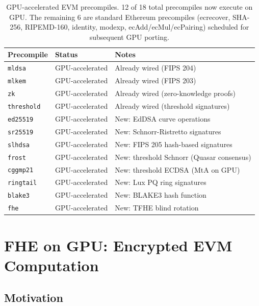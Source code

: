 \documentclass[11pt]{article}
\begin{document}
\begin{table}[h]
\centering
\small
\begin{tabular}{lll}
\toprule
\textbf{Precompile} & \textbf{Status} & \textbf{Notes} \\
\midrule
\texttt{mldsa}     & GPU-accelerated & Already wired (FIPS 204) \\
\texttt{mlkem}     & GPU-accelerated & Already wired (FIPS 203) \\
\texttt{zk}        & GPU-accelerated & Already wired (zero-knowledge proofs) \\
\texttt{threshold} & GPU-accelerated & Already wired (threshold signatures) \\
\texttt{ed25519}   & GPU-accelerated & New: EdDSA curve operations \\
\texttt{sr25519}   & GPU-accelerated & New: Schnorr-Ristretto signatures \\
\texttt{slhdsa}    & GPU-accelerated & New: FIPS 205 hash-based signatures \\
\texttt{frost}     & GPU-accelerated & New: threshold Schnorr (Quasar consensus) \\
\texttt{cggmp21}   & GPU-accelerated & New: threshold ECDSA (MtA on GPU) \\
\texttt{ringtail}  & GPU-accelerated & New: Lux PQ ring signatures \\
\texttt{blake3}    & GPU-accelerated & New: BLAKE3 hash function \\
\texttt{fhe}       & GPU-accelerated & New: TFHE blind rotation \\
\bottomrule
\end{tabular}
\caption{GPU-accelerated EVM precompiles. 12 of 18 total precompiles now execute on GPU.
The remaining 6 are standard Ethereum precompiles (ecrecover, SHA-256, RIPEMD-160,
identity, modexp, ecAdd/ecMul/ecPairing) scheduled for subsequent GPU porting.}
\label{tab:precompiles}
\end{table}

\section{FHE on GPU: Encrypted EVM Computation}
\label{sec:fhe}

\subsection{Motivation}
\end{document}
